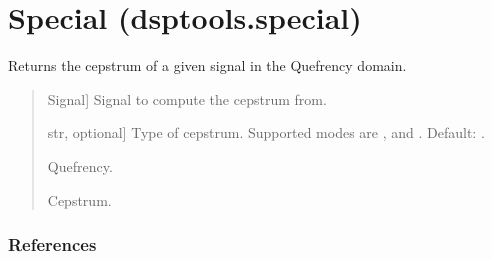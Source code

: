 \documentclass[letterpaper,10pt,english]{sphinxmanual}
\begin{document}
\sphinxstepscope


\section{Special (dsptools.special)}
\label{\detokenize{modules/dsptools.special:module-dsptools.special}}\label{\detokenize{modules/dsptools.special:special-dsptools-special}}\label{\detokenize{modules/dsptools.special::doc}}

\begin{fulllineitems}
\label{\detokenize{modules/dsptools.special:dsptools.special.cepstrum}}
\pysigstartsignatures
{}
\pysigstopsignatures
\sphinxAtStartPar
Returns the cepstrum of a given signal in the Quefrency domain.
\begin{quote}\begin{description}
\begin{description}
\sphinxlineitem{\sphinxstylestrong{signal}}{[}Signal{]}
\sphinxAtStartPar
Signal to compute the cepstrum from.

\sphinxlineitem{\sphinxstylestrong{mode}}{[}str, optional{]}
\sphinxAtStartPar
Type of cepstrum. Supported modes are ,  and
. Default: .

\end{description}

\begin{description}
\sphinxlineitem{\sphinxstylestrong{que}}{[}\sphinxtitleref{np.ndarray}{]}
\sphinxAtStartPar
Quefrency.

\sphinxlineitem{\sphinxstylestrong{ceps}}{[}\sphinxtitleref{np.ndarray}{]}
\sphinxAtStartPar
Cepstrum.

\end{description}

\end{description}\end{quote}
\subsubsection*{References}

\sphinxAtStartPar
{}

\end{fulllineitems}
\end{document}
